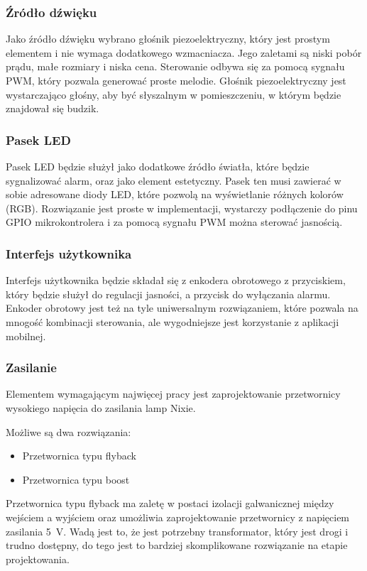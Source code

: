 \documentclass[../main.tex]{subfiles}
\begin{document}
\subsubsection{Źródło dźwięku}
Jako źródło dźwięku wybrano głośnik piezoelektryczny, który jest prostym elementem i nie wymaga dodatkowego wzmacniacza. Jego zaletami są niski pobór prądu, małe rozmiary i niska cena.
Sterowanie odbywa się za pomocą sygnału PWM, który pozwala generować proste melodie. Głośnik piezoelektryczny jest wystarczająco głośny,
aby być słyszalnym w pomieszczeniu, w którym będzie znajdował się budzik.

\subsubsection{Pasek LED}
Pasek LED będzie służył jako dodatkowe źródło światła, które będzie sygnalizować alarm, oraz jako element estetyczny. Pasek ten musi 
zawierać w sobie adresowane diody LED, które pozwolą na wyświetlanie różnych kolorów (RGB).
Rozwiązanie jest proste w implementacji, wystarczy podłączenie do pinu GPIO mikrokontrolera i za pomocą sygnału PWM można sterować jasnością.

\subsubsection{Interfejs użytkownika}
Interfejs użytkownika będzie składał się z enkodera obrotowego z przyciskiem, który będzie służył do regulacji jasności, a przycisk do wyłączania alarmu.
Enkoder obrotowy jest też na tyle uniwersalnym rozwiązaniem, które pozwala na mnogość kombinacji sterowania, ale wygodniejsze jest korzystanie z aplikacji mobilnej.

\subsubsection{Zasilanie}
Elementem wymagającym najwięcej pracy jest zaprojektowanie przetwornicy wysokiego napięcia do zasilania lamp Nixie.

Możliwe są dwa rozwiązania:
\begin{itemize}
    \item Przetwornica typu flyback
    \item Przetwornica typu boost
\end{itemize}

Przetwornica typu flyback ma zaletę w postaci izolacji galwanicznej między wejściem a wyjściem oraz umożliwia zaprojektowanie przetwornicy z napięciem zasilania \SI{5}{\volt}. 
Wadą jest to, że jest potrzebny transformator, który jest drogi i trudno dostępny, do tego jest to bardziej skomplikowane rozwiązanie na etapie projektowania.
\end{document}
